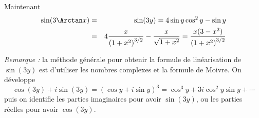 {\begin{enumerate}
{Maintenant
\begin{eqnarray*}
\sin(3\Arctan x) &=& \sin(3y)= 4 \sin y \cos^2 y - \sin y\\
 &=& 4{\frac {x}{\left (1+{x}^{2}\right )^{3/2}}}-{\frac {x}{\sqrt {1+{x}^{2}}}}={\frac {x(3-x^2)}{\left (1+{x}^{2}\right )^{3/2}}}
\end{eqnarray*}

\bigskip

\emph{Remarque :} la méthode générale pour obtenir la formule de linéarisation de $\sin(3y)$ est 
d'utiliser les nombres complexes
et la formule de Moivre. On développe 
$$\cos(3y) + i \sin(3y) = (\cos y + i \sin y)^3 = \cos^3 y + 3i\cos^2y \sin y + \cdots$$ 
puis on identifie les parties imaginaires pour avoir $\sin(3y)$, 
ou les parties réelles pour avoir $\cos(3y)$.}
\end{enumerate}
}